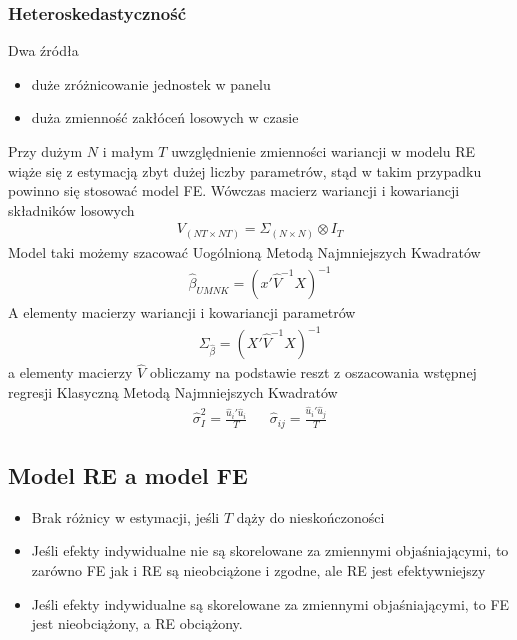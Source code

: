 \subsubsection{Heteroskedastyczność}
Dwa źródła
\begin{itemize}
\item duże zróżnicowanie jednostek w panelu
\item duża zmienność zakłóceń losowych w czasie
\end{itemize}
Przy dużym $ N $ i małym $ T $ uwzględnienie zmienności wariancji w modelu RE wiąże się z estymacją zbyt dużej liczby parametrów, stąd w takim przypadku powinno się stosować model FE. Wówczas macierz wariancji i kowariancji składników losowych
\begin{gather*}
V_{(NT\times NT)}=\Sigma_{(N\times N)}\otimes I_T
\end{gather*}
Model taki możemy szacować Uogólnioną Metodą Najmniejszych Kwadratów
\begin{gather*}
\hat{\beta}_{UMNK}=(x'\hat V^{-1}X)^{-1}
\end{gather*}
A elementy macierzy wariancji i kowariancji parametrów
\begin{gather*}
\Sigma_{\hat{\beta}}=(X'\hat V^{-1}X)^{-1}
\end{gather*}
a elementy macierzy $ \hat V $ obliczamy na podstawie reszt z oszacowania wstępnej regresji Klasyczną Metodą Najmniejszych Kwadratów
\begin{align*}
\hat{\sigma}_I^2=\frac{\hat u_i'\hat u_i}{T}
&&
\hat{\sigma}_{ij}=\frac{\hat u_i'\hat u_j}{T}
\end{align*}
\subsection{Model RE a model FE}
\begin{itemize}
\item Brak różnicy w estymacji, jeśli $ T $ dąży do nieskończoności
\item Jeśli efekty indywidualne nie są skorelowane za zmiennymi objaśniającymi, to zarówno FE jak i RE są nieobciążone i zgodne, ale RE jest efektywniejszy
\item Jeśli efekty indywidualne są skorelowane za zmiennymi objaśniającymi, to FE jest nieobciążony, a RE obciążony.
\end{itemize}
